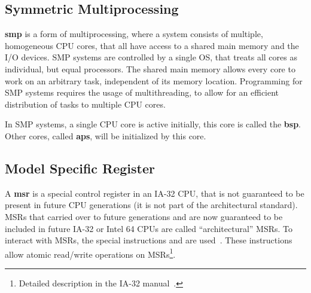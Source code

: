 \subsection{Symmetric Multiprocessing}
\label{subsec:smp}

\textbf{\gls{smp}} is a form of multiprocessing, where a system consists of multiple, homogeneous
CPU cores, that all have access to a shared main memory and the I/O devices. SMP systems are
controlled by a single OS, that treats all cores as individual, but equal processors. The shared
main memory allows every core to work on an arbitrary task, independent of its memory location.
Programming for SMP systems requires the usage of multithreading, to allow for an efficient
distribution of tasks to multiple CPU cores.

In SMP systems, a single CPU core is active initially, this core is called the \textbf{\gls{bsp}}.
Other cores, called \textbf{\glspl{ap}}, will be initialized by this core.

%
%

\subsection{Model Specific Register}
\label{subsec:msr}

A \textbf{\gls{msr}} is a special control register in an IA-32 CPU, that is not guaranteed to be
present in future CPU generations (it is not part of the architectural standard). MSRs that carried
over to future generations and are now guaranteed to be included in future IA-32 or Intel 64 CPUs
are called ``architectural'' MSRs. To interact with MSRs, the special instructions  and
 are used~\cite{x86isa}. These instructions allow atomic read/write operations on
MSRs\footnote{Detailed description in the IA-32 manual~\cite[sec.~4.2]{ia32}.}.

